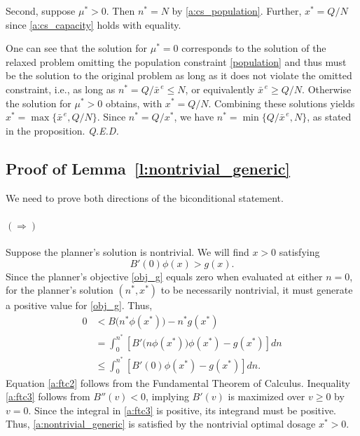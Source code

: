 \documentclass[12pt]{article}
\renewcommand{\qed}{{\it Q.E.D.}}
\newcommand{\efficacy}{\phi}
\newcommand{\general}{g}
\newcommand{\benefit}{B}
\newcommand{\xunitbar}{\bar{x}^{\,e}}
\begin{document}
Second, suppose $\mu^* > 0$. Then $n^* = N$ by
\eqref{a:cs_population}. Further, $x^* = Q/N$ since
\eqref{a:cs_capacity} holds with equality.

One can see that the solution for $\mu^* = 0$ corresponds to the
solution of the relaxed problem omitting the population constraint
\eqref{population} and thus must be the solution to the original
problem as long as it does not violate the omitted constraint, i.e.,
as long as $n^* = Q / \xunitbar \leq N$, or equivalently $\xunitbar
\geq Q / N$. Otherwise the solution for $\mu^* > 0$ obtains, with $x^*
= Q/N$. Combining these solutions yields $x^* = \max \{ \xunitbar, Q/N
\}$. Since $n^* = Q/x^*$, we have $n^* = \min \{ Q/\xunitbar, N \}$,
as stated in the proposition. \qed


\subsection*{Proof of Lemma~\ref{l:nontrivial_generic}}

We need to prove both directions of the biconditional
statement.

\paragraph{$(\Longrightarrow)$}

Suppose the planner's solution is nontrivial. We will find $x > 0$
satisfying
\begin{equation}
\label{a:nontrivial_generic}
B'(0) \efficacy(x) > \general(x).
\end{equation}
Since the planner's objective \eqref{obj_g} equals zero when evaluated
at either $n = 0$, for the planner's solution $(n^*, x^*)$
to be necessarily nontrivial, it must generate a positive value for
\eqref{obj_g}. Thus,
\begin{align}
0 & < \benefit \bigl( n^*\efficacy(x^*) \bigr) - n^* \general(x^*) \label{a:ftc1} \\
& = \int_0^{n^*} \left[ \benefit' \!\bigl( n\efficacy(x^*) \bigr) \efficacy(x^*) - \general(x^*) \right] dn \label{a:ftc2} \\
& \leq \int_0^{n^*} \left[ \benefit'(0) \efficacy(x^*) - \general(x^*) \right] dn. \label{a:ftc3} 
\end{align} 
Equation \eqref{a:ftc2} follows from the Fundamental Theorem of
Calculus.  Inequality \eqref{a:ftc3} follows from $\benefit''(v) < 0$,
implying $\benefit'(v)$ is maximized over $v \geq 0$ by $v = 0$. Since
the integral in \eqref{a:ftc3} is positive, its integrand must be
positive. Thus, \eqref{a:nontrivial_generic} is satisfied by the
nontrivial optimal dosage $x^* > 0$.
\end{document}
